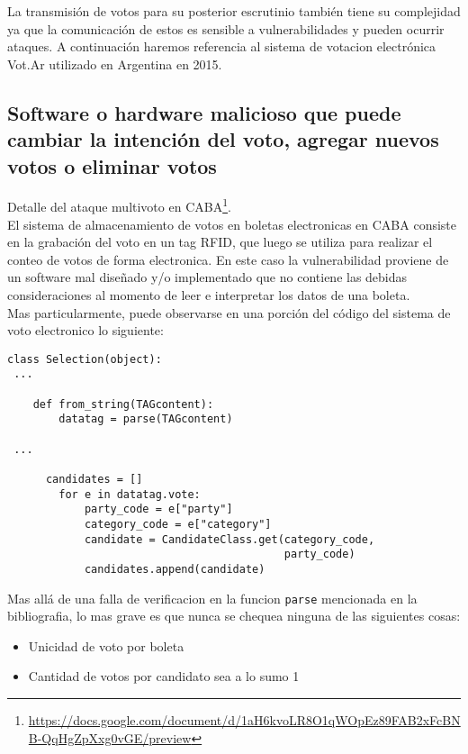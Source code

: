 La transmisión de votos para su posterior escrutinio también tiene su complejidad ya que la comunicación de estos es sensible a vulnerabilidades y pueden ocurrir ataques. A continuación haremos referencia al sistema de votacion electrónica Vot.Ar utilizado en Argentina en 2015.

\subsection{Software o hardware malicioso que puede cambiar la intención del voto, agregar nuevos votos o eliminar votos}
Detalle del ataque multivoto en CABA\footnote{\url{https://docs.google.com/document/d/1aH6kvoLR8O1qWOpEz89FAB2xFcBNB-QqHgZpXxg0vGE/preview}}.\\

El sistema de almacenamiento de votos en boletas electronicas en CABA consiste en la grabación del voto en un tag RFID, que luego se utiliza para realizar el conteo de votos de forma electronica. En este caso la vulnerabilidad proviene de un software mal diseñado y/o implementado que no contiene las debidas consideraciones al momento de leer e interpretar los datos de una boleta.\\

Mas particularmente, puede observarse en una porción del código del sistema de voto electronico lo siguiente:

\begin{lstlisting}
class Selection(object):
 ...

    def from_string(TAGcontent):
        datatag = parse(TAGcontent)

 ...

      candidates = []
        for e in datatag.vote:
            party_code = e["party"]
            category_code = e["category"]
            candidate = CandidateClass.get(category_code,
                                           party_code)
            candidates.append(candidate)

\end{lstlisting}

Mas allá de una falla de verificacion en la funcion \texttt{parse} mencionada en la bibliografia, lo mas grave es que nunca se chequea ninguna de las siguientes cosas:
\begin{itemize}
	\item Unicidad de voto por boleta
	\item Cantidad de votos por candidato sea a lo sumo 1
\end{itemize}

